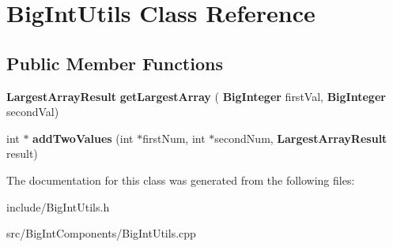 \section{Big\+Int\+Utils Class Reference}
\label{class_big_int_utils}
\subsection*{Public Member Functions}
\begin{DoxyCompactItemize}
\item 
\mbox{\label{class_big_int_utils_a6f355ec25a51cf1f480966d6d0780ea4}} 
\textbf{ Largest\+Array\+Result} {\bfseries get\+Largest\+Array} (\textbf{ Big\+Integer} first\+Val, \textbf{ Big\+Integer} second\+Val)
\item 
\mbox{\label{class_big_int_utils_a593ae84f25f4472e9dba017969dc2d24}} 
int $\ast$ {\bfseries add\+Two\+Values} (int $\ast$first\+Num, int $\ast$second\+Num, \textbf{ Largest\+Array\+Result} result)
\end{DoxyCompactItemize}


The documentation for this class was generated from the following files\+:\begin{DoxyCompactItemize}
\item 
include/Big\+Int\+Utils.\+h\item 
src/\+Big\+Int\+Components/Big\+Int\+Utils.\+cpp\end{DoxyCompactItemize}
